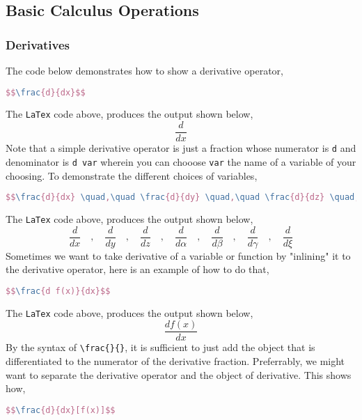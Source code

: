 \documentclass[a4paper, 12pt]{report}
\begin{document}
\begin{center}
\subsection{Basic Calculus Operations}
\begin{comment}
\end{comment}
\subsubsection{Derivatives} \label{derivatives}
\begin{comment}
\end{comment}

The code below demonstrates how to show a derivative operator,
\begin{lstlisting}[language=tex]
$$\frac{d}{dx}$$
\end{lstlisting}
The \texttt{LaTex} code above, produces the output shown below,
$$\frac{d}{dx}$$
Note that a simple derivative operator is just a fraction whose numerator is \texttt{d} and denominator is \texttt{d var} wherein you can chooose \texttt{var} the name of a variable of your choosing. To demonstrate the different choices of variables,
\begin{lstlisting}[language=tex]
$$\frac{d}{dx} \quad,\quad \frac{d}{dy} \quad,\quad \frac{d}{dz} \quad,\quad \frac{d}{d \alpha} \quad,\quad \frac{d}{d \beta} \quad,\quad \frac{d}{d \gamma} \quad,\quad \frac{d}{d \xi}$$
\end{lstlisting}
The \texttt{LaTex} code above, produces the output shown below,
$$\frac{d}{dx} \quad,\quad \frac{d}{dy} \quad,\quad \frac{d}{dz} \quad,\quad \frac{d}{d \alpha} \quad,\quad \frac{d}{d \beta} \quad,\quad \frac{d}{d \gamma} \quad,\quad \frac{d}{d \xi}$$
Sometimes we want to take derivative of a variable or function by "inlining" it to the derivative operator, here is an example of how to do that,
\begin{lstlisting}[language=tex]
$$\frac{d f(x)}{dx}$$
\end{lstlisting}
The \texttt{LaTex} code above, produces the output shown below,
$$\frac{d f(x)}{dx}$$
By the syntax of \texttt{\textbackslash frac\{\}\{\}}, it is sufficient to just add the object that is differentiated to the numerator of the derivative fraction. Preferrably, we might want to separate the derivative operator and the object of derivative. This shows how,
\begin{lstlisting}[language=tex]
$$\frac{d}{dx}[f(x)]$$

\end{lstlisting}
\end{center}
\end{document}
